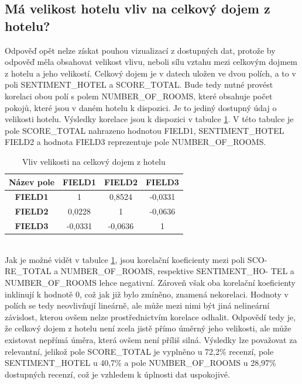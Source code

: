 \documentclass[czech,BP]{thesiskiv}
\begin{document}
\subsection{Má velikost hotelu vliv na celkový dojem z hotelu?}
Odpověď opět nelze získat pouhou vizualizací z dostupných dat, protože by odpověď měla obsahovat velikost vlivu, neboli sílu vztahu mezi celkovým dojmem z hotelu a jeho velikostí. Celkový dojem je v datech uložen ve dvou polích, a to v poli SENTIMENT\_HOTEL a SCORE\_TOTAL. Bude tedy nutné provést korelaci obou polí s polem NUMBER\_OF\_ROOMS, které obsahuje počet pokojů, které jsou v daném hotelu k dispozici. Je to jediný dostupný údaj o velikosti hotelu.  Výsledky korelace jsou k dispozici v tabulce \ref{hotel_korelace}. V této tabulce je pole SCORE\_TOTAL nahrazeno hodnotou FIELD1, SENTIMENT\_HOTEL FIELD2 a hodnota FIELD3 reprezentuje pole NUMBER\_OF\_ROOMS.
\begin{table}[h]
	\centering
	\caption{Vliv velikosti na celkový dojem z hotelu}
	\label{hotel_korelace}
	\begin{tabular}{|c|c|c|c|}
		\hline
		\textbf{Název pole} & \textbf{FIELD1} & \textbf{FIELD2} & \textbf{FIELD3} \\ \hline
		\textbf{FIELD1}     & 1               & 0,8524          & -0,0331         \\ \hline
		\textbf{FIELD2}     & 0,0228          & 1               & -0,0636         \\ \hline
		\textbf{FIELD3}     & -0,0331         & -0,0636         & 1               \\ \hline
	\end{tabular}
\end{table}
\mbox{}\\
Jak je možné vidět v tabulce \ref{hotel_korelace}, jsou korelační koeficienty mezi poli SCO- RE\_TOTAL a NUMBER\_OF\_ROOMS, respektive SENTIMENT\_HO- TEL a NUMBER\_OF\_ROOMS lehce negativní. Zároveň však oba korelační koeficienty inklinují k hodnotě 0, což jak již bylo zmíněno, znamená nekorelaci. Hodnoty v polích se tedy neovlivňují lineárně, ale může mezi nimi být jiná nelineární závislost, kterou ovšem nelze prostřednictvím korelace odhalit. Odpovědí tedy je, že  celkový dojem z hotelu není zcela jistě přímo úměrný jeho velikosti, ale může existovat nepřímá úměra, která ovšem není příliš silná. Výsledky lze považovat za relevantní, jelikož pole SCORE\_TOTAL je vyplněno u 72,2\% recenzí, pole SENTIMENT\_HOTEL u 40,7\% a pole NUMBER\_OF\_ROOMS u 28,97\% dostupných recenzí, což je vzhledem k úplnosti dat uspokojivé.
\end{document}
